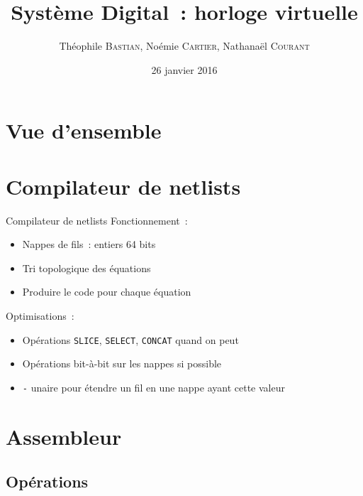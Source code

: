 \documentclass[11pt]{beamer}
\author{Théophile \textsc{Bastian}, Noémie \textsc{Cartier}, Nathanaël \textsc{Courant}}
\title{Système Digital~: horloge virtuelle}
\date{26 janvier 2016}
\begin{document}
\begin{frame}
\titlepage
\end{frame}


\section*{Vue d'ensemble}


\begin{frame}
\setcounter{tocdepth}{1} %
\tableofcontents
\end{frame}

\section{Compilateur de netlists}
\begin{frame}{Compilateur de netlists}
Fonctionnement~:
\begin{itemize}
\item{Nappes de fils~: entiers 64 bits}
\item{Tri topologique des équations}
\item{Produire le code pour chaque équation}
\end{itemize}

Optimisations~:
\begin{itemize}
\item{Opérations \verb!SLICE!, \verb!SELECT!, \verb!CONCAT! quand on
    peut}
\item{Opérations bit-à-bit sur les nappes si possible}
\item{\og{}\verb!-!\fg{} unaire pour étendre un fil en une nappe ayant cette
    valeur}
\end{itemize}
\end{frame}

\section{Assembleur}

\subsection{Opérations}
\end{document}
